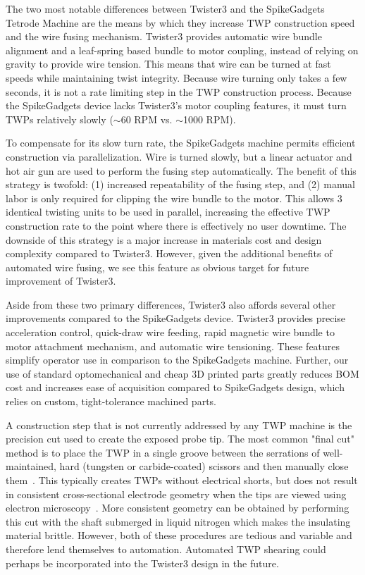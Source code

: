 \documentclass[11pt,a4paper]{article}
\begin{document}
The two most notable differences between Twister3 and the SpikeGadgets Tetrode
Machine are the means by which they increase TWP construction speed and the
wire fusing mechanism. Twister3 provides automatic wire bundle alignment and a
leaf-spring based bundle to motor coupling, instead of relying on gravity to
provide wire tension. This means that wire can be turned at fast
speeds while maintaining twist integrity. Because wire turning only takes a few
seconds, it is not a rate limiting step in the TWP construction process.
Because the SpikeGadgets device lacks Twister3's motor coupling features, it
must turn TWPs relatively slowly ($\sim$60 RPM vs. $\sim$1000 RPM).

To compensate for its slow turn rate, the SpikeGadgets machine permits
efficient construction via parallelization. Wire is turned slowly, but a linear
actuator and hot air gun are used to perform the fusing step automatically. The
benefit of this strategy is twofold: (1) increased repeatability of the fusing
step, and (2) manual labor is only required for clipping the wire bundle
to the motor. This allows 3 identical twisting units to be used in parallel,
increasing the effective TWP construction rate to the point where there is
effectively no user downtime. The downside of this strategy is a major increase
in materials cost and design complexity compared to Twister3. However, given
the additional benefits of automated wire fusing, we see this feature as
obvious target for future improvement of Twister3.

Aside from these two primary differences, Twister3 also affords several other
improvements compared to the SpikeGadgets device. Twister3 provides precise
acceleration control, quick-draw wire feeding, rapid magnetic wire bundle to
motor attachment mechanism, and automatic wire tensioning. These features
simplify operator use in comparison to the SpikeGadgets machine. Further, our
use of standard optomechanical and cheap 3D printed parts greatly reduces BOM
cost and increases ease of acquisition compared to SpikeGadgets design, which
relies on custom, tight-tolerance machined parts.

A construction step that is not currently addressed by any TWP machine is the
precision cut used to create the exposed probe tip. The most common "final cut"
method is to place the TWP in a single groove between the serrations of
well-maintained, hard (tungsten or carbide-coated) scissors and then
manually close them~\cite{Nguyen2009,Ferguson2009a}. This typically creates
TWPs without electrical shorts, but does not result in consistent
cross-sectional electrode geometry when the tips are viewed using electron
microscopy~\cite{Ferguson2009a}. More consistent geometry can be obtained by
performing this cut with the shaft submerged in liquid nitrogen which makes the
insulating material brittle. However, both of these procedures are tedious and
variable and therefore lend themselves to automation. Automated TWP
shearing could perhaps be incorporated into the Twister3 design in the future.
\end{document}
